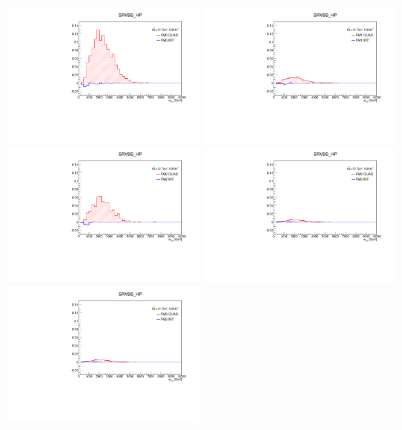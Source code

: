 \begin{figure}[]
    \centering
        \includegraphics[width=0.45\textwidth]{figures/aQGC/FM0_0ptag1pfat0pjet_0ptv_SRVBS_HP_MllJ.pdf}
        \includegraphics[width=0.45\textwidth]{figures/aQGC/FM1_0ptag1pfat0pjet_0ptv_SRVBS_HP_MllJ.pdf}
        \includegraphics[width=0.45\textwidth]{figures/aQGC/FM2_0ptag1pfat0pjet_0ptv_SRVBS_HP_MllJ.pdf}
        \includegraphics[width=0.45\textwidth]{figures/aQGC/FM3_0ptag1pfat0pjet_0ptv_SRVBS_HP_MllJ.pdf}
        \includegraphics[width=0.45\textwidth]{figures/aQGC/FM3_0ptag1pfat0pjet_0ptv_SRVBS_HP_MllJ.pdf}

\end{figure}
